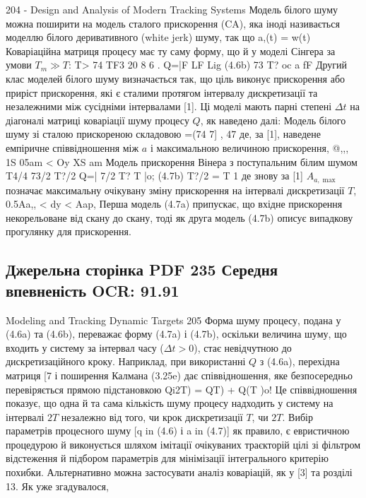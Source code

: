 \documentclass[11pt]{article}
\begin{document}
204 - Design and Analysis of Modern Tracking Systems
Модель білого шуму можна поширити на модель сталого прискорення (CA),
яка іноді називається моделлю білого деривативного (white jerk) шуму, так що
a,(t) = w(t)
Коваріаційна матриця процесу має ту саму форму, що й у моделі Сінгера
за умови $T_m \gg T$:
T> 74 TF3
20 8 6 .
Q=|F LF Lig (4.6b)
73 T?
oc a fF
Другий клас моделей білого шуму визначається так, що
ціль виконує прискорення або приріст прискорення, які є
сталими протягом інтервалу дискретизації та незалежними між сусідніми
інтервалами [1]. Ці моделі мають парні степені $\Delta t$ на
діагоналі матриці коваріації шуму процесу $Q$, як наведено далі:
Модель білого шуму зі сталою прискореною складовою
=(74 7] , 47
де, за [1], наведене емпіричне співвідношення між $a$ і максимальною величиною
прискорення,
@,,, 1S
05am < Oy XS am
Модель прискорення Вінера з поступальним білим шумом
T4/4 73/2 T?/2
Q=| 7/2 T? T |o; (4.7b)
T?/2 = T 1
де знову за [1] $A_{a,\max}$ позначає максимальну очікувану зміну прискорення
на інтервалі дискретизації $T$,
0.5Aa,, < dy < Aap,
Перша модель (4.7a) припускає, що вхідне прискорення некорельоване від скану
до скану, тоді як друга модель (4.7b) описує випадкову прогулянку
для прискорення.
\clearpage\subsection*{Джерельна сторінка PDF 235 \quad Середня впевненість OCR: 91.91}
Modeling and Tracking Dynamic Targets 205
Форма шуму процесу, подана у (4.6a) та (4.6b), переважає
форму (4.7a) і (4.7b), оскільки величина шуму, що входить у систему за
інтервал часу ($\Delta t > 0$), стає невідчутною до дискретизаційного
кроку. Наприклад, при використанні $Q$ з (4.6a), перехідна матриця
[7
і поширення Калмана (3.25e) дає співвідношення, яке безпосередньо
перевіряється прямою підстановкою
Qi2T) = QT) + Q(T )o!
Це співвідношення показує, що одна й та сама кількість шуму процесу
надходить у систему на інтервалі $2T$ незалежно від того, чи крок дискретизації
$T$, чи $2T$.
Вибір параметрів процесного шуму [q in (4.6) і a in (4.7)]
як правило, є евристичною процедурою й виконується шляхом імітації
очікуваних траєкторій цілі зі фільтром відстеження й підбором параметрів
для мінімізації інтегрального критерію похибки. Альтернативно можна
застосувати аналіз коваріацій, як у [3] та розділі 13. Як уже згадувалося,
\end{document}
